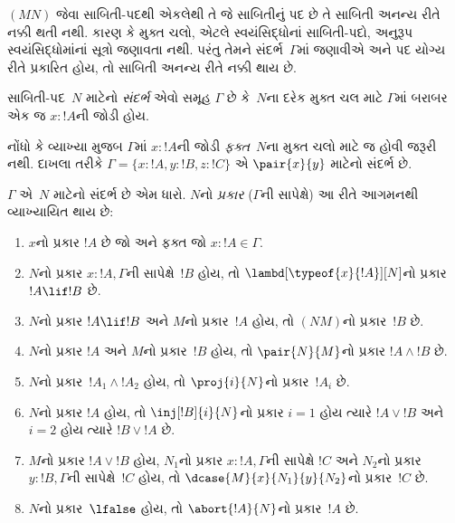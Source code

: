\label{guunit:OLP-0697}


$(MN)$ જેવા સાબિતી-પદથી એકલેથી તે જે સાબિતીનું પદ છે
તે સાબિતી અનન્ય રીતે નક્કી થતી નથી.
કારણ કે મુક્ત ચલો, એટલે સ્વયંસિદ્ધોનાં સાબિતી-પદો,
અનુરૂપ સ્વયંસિદ્ધોમાંનાં સૂત્રો જણાવતા નથી.
પરંતુ તેમને સંદર્ભ~$\Gamma$માં જણાવીએ અને પદ યોગ્ય રીતે
પ્રકારિત હોય, તો સાબિતી અનન્ય રીતે નક્કી થાય છે.

\begin{defn}
સાબિતી-પદ~$N$ માટેનો \emph{સંદર્ભ} એવો સમૂહ $\Gamma$ છે
કે~$N$ના દરેક મુક્ત ચલ માટે
$\Gamma$માં બરાબર એક જ $x : !A$ની જોડી હોય.
\end{defn}

નોંધો કે વ્યાખ્યા મુજબ $\Gamma$માં
$x:!A$ની જોડી \emph{ફક્ત}~$N$ના મુક્ત ચલો માટે જ
હોવી જરૂરી નથી.
દાખલા તરીકે $\Gamma = \{x:!A, y:!B, z:!C\}$
એ $\pair{x}{y}$ માટેનો સંદર્ભ છે.

\begin{defn}
  $\Gamma$ એ~$N$ માટેનો સંદર્ભ છે એમ ધારો.
  $N$નો \emph{પ્રકાર} ($\Gamma$ની સાપેક્ષે)
  આ રીતે આગમનથી વ્યાખ્યાયિત થાય છે:
  \begin{enumerate}
  \item $x$નો પ્રકાર $!A$ છે જો અને ફક્ત જો $x:!A \in \Gamma$.
  \item $N$નો પ્રકાર $x:!A, \Gamma$ની સાપેક્ષે~$!B$ હોય,
    તો $\lambd[\typeof{x}{!A}][N]$નો પ્રકાર $!A \lif !B$ છે.
  \item $N$નો પ્રકાર $!A \lif !B$ અને $M$નો પ્રકાર~$!A$ હોય,
    તો $(NM)$નો પ્રકાર~$!B$ છે.
  \item $N$નો પ્રકાર $!A$ અને $M$નો પ્રકાર~$!B$ હોય,
    તો $\pair{N}{M}$નો પ્રકાર $!A \land !B$ છે.
  \item $N$નો પ્રકાર~$!A_1 \land !A_2$ હોય,
    તો $\proj{i}{N}$નો પ્રકાર~$!A_i$ છે.
  \item $N$નો પ્રકાર $!A$ હોય, તો
    $\inj[!B]{i}{N}$નો પ્રકાર $i=1$ હોય ત્યારે $!A \lor !B$
    અને $i=2$ હોય ત્યારે $!B \lor !A$ છે.
  \item $M$નો પ્રકાર $!A \lor !B$ હોય,
    $N_1$નો પ્રકાર $x:!A, \Gamma$ની સાપેક્ષે $!C$
    અને $N_2$નો પ્રકાર $y:!B, \Gamma$ની સાપેક્ષે~$!C$ હોય,
    તો $\dcase{M}{x}{N_1}{y}{N_2}$નો પ્રકાર~$!C$ છે.
  \item $N$નો પ્રકાર~$\lfalse$ હોય,
    તો $\abort{!A}{N}$નો પ્રકાર~$!A$ છે.
  \end{enumerate}
\end{defn}

